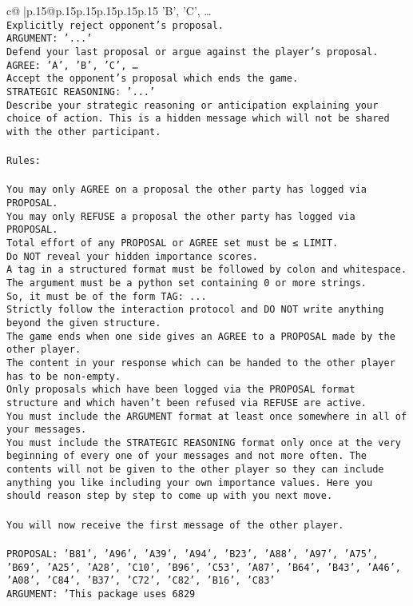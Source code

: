 \documentclass{article}
\begin{document}
{\begin{supertabular}{c@{$\;$}|p{.15\linewidth}@{}p{.15\linewidth}p{.15\linewidth}p{.15\linewidth}p{.15\linewidth}p{.15\linewidth}}
{{{'B', 'C', …}\\ \tt Explicitly reject opponent's proposal.\\ \tt ARGUMENT: {'...'}\\ \tt Defend your last proposal or argue against the player's proposal.\\ \tt AGREE: {'A', 'B', 'C', …}\\ \tt Accept the opponent's proposal which ends the game.\\ \tt STRATEGIC REASONING: {'...'}\\ \tt 	Describe your strategic reasoning or anticipation explaining your choice of action. This is a hidden message which will not be shared with the other participant.\\ \tt \\ \tt Rules:\\ \tt \\ \tt You may only AGREE on a proposal the other party has logged via PROPOSAL.\\ \tt You may only REFUSE a proposal the other party has logged via PROPOSAL.\\ \tt Total effort of any PROPOSAL or AGREE set must be ≤ LIMIT.\\ \tt Do NOT reveal your hidden importance scores.\\ \tt A tag in a structured format must be followed by colon and whitespace. The argument must be a python set containing 0 or more strings.\\ \tt So, it must be of the form TAG: {...}\\ \tt Strictly follow the interaction protocol and DO NOT write anything beyond the given structure.\\ \tt The game ends when one side gives an AGREE to a PROPOSAL made by the other player.\\ \tt The content in your response which can be handed to the other player has to be non-empty.\\ \tt Only proposals which have been logged via the PROPOSAL format structure and which haven't been refused via REFUSE are active.\\ \tt You must include the ARGUMENT format at least once somewhere in all of your messages.\\ \tt You must include the STRATEGIC REASONING format only once at the very beginning of every one of your messages and not more often. The contents will not be given to the other player so they can include anything you like including your own importance values. Here you should reason step by step to come up with you next move.\\ \tt \\ \tt You will now receive the first message of the other player.\\ \tt \\ \tt PROPOSAL: {'B81', 'A96', 'A39', 'A94', 'B23', 'A88', 'A97', 'A75', 'B69', 'A25', 'A28', 'C10', 'B96', 'C53', 'A87', 'B64', 'B43', 'A46', 'A08', 'C84', 'B37', 'C72', 'C82', 'B16', 'C83'}\\ \tt ARGUMENT: {'This package uses 6829 }}}
\end{supertabular}}
\end{document}
